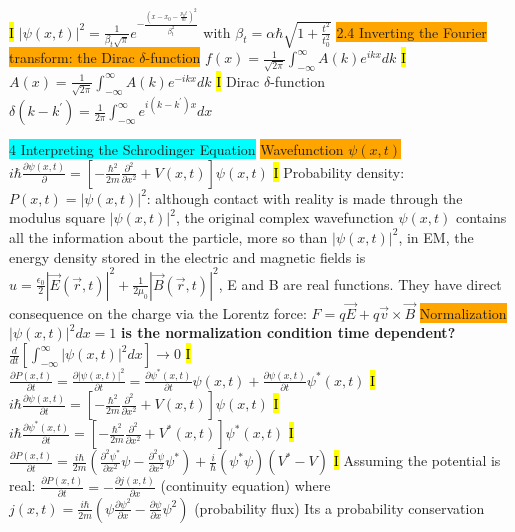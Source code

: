 \documentclass[fontsize=4pt]{scrartcl}
\begin{document}
\hl{I}
$|\psi(x,t)|^2 = \frac{1}{\beta_t \sqrt{\pi}}e^{-\frac{(x-x_0 - \frac{p_0 t}{m})^2}{\beta_t^2}}$ with $ \beta_t = \alpha \hbar \sqrt{1+\frac{t^2}{t^2_0}}$
\colorbox{Orange}{2.4 Inverting the Fourier transform: the Dirac $\delta$-function}
$f(x) = \frac{1}{\sqrt{2\pi}} \int_{-\infty}^{\infty}A(k)e^{ikx}dk$
\hl{I}
$A(x) = \frac{1}{\sqrt{2\pi}} \int_{-\infty}^{\infty}A(k)e^{-ikx}dk$
\hl{I}
Dirac $\delta$-function $\delta(k - k^{\prime}) = \frac{1}{2\pi} \int_{-\infty}^{\infty} e^{i (k - k^{\prime}) x} dx$















\colorbox{Cyan}{4 Interpreting the Schrodinger Equation}
\colorbox{Orange}{Wavefunction $\psi(x,t)$}
$i\hbar \frac{\partial \psi (x,t)}{\partial} = [-\frac{\hbar^2}{2m} \frac{\partial^2}{\partial x^2} + V(x,t)] \psi(x,t)$
\hl{I}
Probability density:$ P(x,t) = |\psi(x,t)|^2$: although contact with reality is made through the modulus square $|\psi(x,t)|^2$, the original complex wavefunction $\psi(x,t)$ contains all the information about the particle, more so than $|\psi(x,t)|^2$, in EM, the energy density stored in the electric and magnetic fields is 
$u = \frac{\epsilon_0}{2}|\vec{E}(\vec{r},t)|^2 + \frac{1}{2\mu_0}|\vec{B}(\vec{r},t)|^2$, E and B are real functions. They have direct consequence on the charge via the Lorentz force: $F = q\vec{E} + q\vec{v} \times \vec{B}$
\colorbox{Orange}{Normalization}
$|\psi(x,t)|^2 dx = 1$
\textbf{is the normalization condition time dependent?}
$\frac{d}{dt}[\int_{-\infty}^{\infty}|\psi(x,t)|^2 dx] \rightarrow 0$
\hl{I}
$\frac{\partial P(x,t)}{\partial t} = \frac{\partial |\psi(x,t)|^2}{\partial t} = \frac{\partial \psi^{*}(x,t)}{\partial t}\psi(x,t) + \frac{\partial \psi(x,t)}{\partial t}\psi^{*}(x,t)$
\hl{I}
$i\hbar \frac{\partial \psi (x,t)}{\partial t} = [-\frac{\hbar^2}{2m} \frac{\partial^2}{\partial x^2} + V(x,t)] \psi(x,t)$
\hl{I}
$i\hbar \frac{\partial \psi^{*} (x,t)}{\partial t} = [-\frac{\hbar^2}{2m} \frac{\partial^2}{\partial x^2} + V^{*}(x,t)] \psi^{*}(x,t)$
\hl{I}
$\frac{\partial P (x,t)}{\partial t} = \frac{i\hbar}{2m}( \frac{\partial^2 \psi^{*}}{\partial x^2}\psi -  \frac{\partial^2 \psi}{\partial x^2}\psi^{*}) + \frac{i}{\hbar}(\psi^{*}\psi)(V^{*} - V)$
\hl{I}
Assuming the potential is real: $\frac{\partial P(x,t)}{\partial t} = -\frac{\partial j(x,t)}{\partial x}$ (continuity equation) where $j(x,t) = \frac{i\hbar}{2m}(\psi \frac{\partial \psi^2}{\partial x} - \frac{\partial \psi}{\partial x}\psi^2)$ (probability flux) Its a probability conservation
\end{document}
